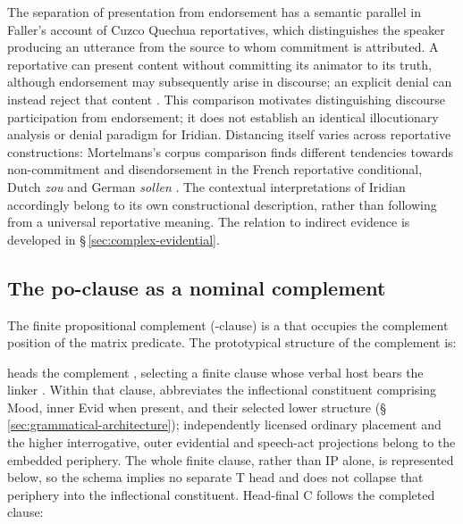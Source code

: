 The separation of presentation from endorsement has a semantic parallel in
Faller's account of Cuzco Quechua reportatives, which distinguishes the
speaker producing an utterance from the source to whom commitment is
attributed. A reportative can present content without committing its
animator to its truth, although endorsement may subsequently arise in
discourse; an explicit denial can instead reject that content
\cite[§§1, 5--6]{faller2019}. This comparison
motivates distinguishing discourse participation from endorsement; it does
not establish an identical illocutionary analysis or denial paradigm for
Iridian. Distancing itself varies across reportative constructions:
Mortelmans's corpus comparison finds different tendencies towards
non-commitment and disendorsement in the French reportative conditional,
Dutch \textit{zou} and German \textit{sollen}
\cite[§§3.1, 5.2]{mortelmans2025}. The contextual interpretations of
Iridian  accordingly belong to its own constructional description,
rather than following from a universal reportative meaning. The relation
to indirect evidence is developed in §\,\ref{sec:complex-evidential}.

\subsection{The po-clause as a nominal  complement}
\label{sec:vm-po-comp}

The finite propositional complement (-clause) is a  that
occupies the complement position of the matrix predicate. The prototypical
structure of the complement  is:

\begin{center}
\end{center}

\noindent {} heads the complement , selecting a finite
clause whose verbal host bears the linker . Within that clause,
 abbreviates the inflectional constituent comprising Mood,
inner Evid when present, and their selected lower structure
(§\,\ref{sec:grammatical-architecture}); independently licensed ordinary
placement and the higher interrogative, outer evidential and speech-act
projections belong to the embedded periphery.
The whole finite clause, rather than IP alone, is represented below, so the
schema implies no separate T head and does not collapse that periphery into
the inflectional constituent. Head-final C follows the completed clause:

